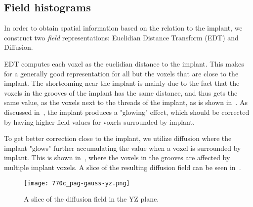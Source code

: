 \subsection{Field histograms}
In order to obtain spatial information based on the relation to the implant, we construct two \textit{field} representations: Euclidian Distance Transform (EDT) and Diffusion.

EDT computes each voxel as the euclidian distance to the implant. 
This makes for a generally good representation for all but the voxels that are close to the implant.
The shortcoming near the implant is mainly due to the fact that the voxels in the grooves of the implant has the same distance, and thus gets the same value, as the voxels next to the threads of the implant, as is shown in~.
As discussed in~, the implant produces a "glowing" effect, which should be corrected by having higher field values for voxels surrounded by implant.

To get better correction close to the implant, we utilize diffusion where the implant "glows" further accumulating the value when a voxel is surrounded by implant.
This is shown in~, where the voxels in the grooves are affected by multiple implant voxels.
A slice of the resulting diffusion field can be seen in~.

\begin{figure}
    \texttt{[image: 770c\_pag-gauss-yz.png]}
    \caption{A slice of the diffusion field in the YZ plane.}
    \label{fig:field-slice}
\end{figure}

